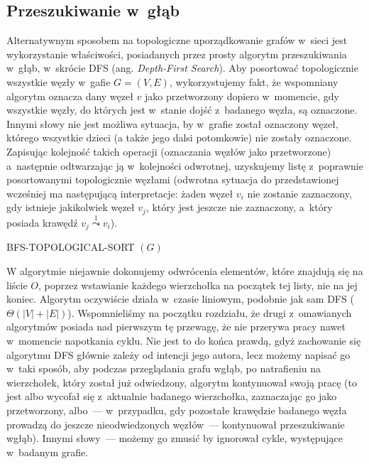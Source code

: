 \subsection{Przeszukiwanie w~głąb}

Alternatywnym sposobem na topologiczne uporządkowanie grafów w~sieci jest wykorzystanie właściwości, posiadanych przez prosty algorytm przeszukiwania w~głąb, w~skrócie \textsf{DFS} (ang. \textit{Depth-First Search}). Aby posortować topologicznie wszystkie węzły w~gafie $G = \left( V, E \right)$, wykorzystujemy fakt, że wspomniany algorytm oznacza dany węzeł $v$ jako przetworzony dopiero w~momencie, gdy wszystkie węzły, do których jest w~stanie dojść z~badanego węzła, są oznaczone. Innymi słowy nie jest możliwa sytuacja, by w~grafie został oznaczony węzeł, którego wszystkie dzieci (a także jego dalsi potomkowie) nie zostały oznaczone. Zapisując kolejność takich operacji (oznaczania węzłów jako przetworzone) a~następnie odtwarzając ją w~kolejności odwrotnej, uzyskujemy listę z~poprawnie posortowanymi topologicznie węzłami (odwrotna sytuacja do przedstawionej wcześniej ma następującą interpretacje: żaden węzeł $v_{i}$ nie zostanie zaznaczony, gdy istnieje jakikolwiek węzeł $v_{j}$, który jest jeszcze nie zaznaczony, a~który posiada krawędź $v_{j} \overset{1} \leadsto v_{i}$).

\begin{algorithm}[!htbp]
\DontPrintSemicolon
{}
\caption{ BFS-TOPOLOGICAL-SORT $\left( G \right)$\label{alg:BFSTopologicalSort}}
\end{algorithm}

W algorytmie niejawnie dokonujemy odwrócenia elementów, które znajdują się na liście $O$, poprzez wstawianie każdego wierzchołka na początek tej listy, nie na jej koniec. Algorytm oczywiście działa w~czasie liniowym, podobnie jak sam \textsf{DFS} ($ \Theta \left( \left| V \right| + \left| E \right| \right)$). Wspomnieliśmy na początku rozdziału, że drugi z~omawianych algorytmów posiada nad pierwszym tę przewagę, że nie przerywa pracy nawet w~momencie napotkania cyklu. Nie jest to do końca prawdą, gdyż zachowanie się algorytmu \textsf{DFS} głównie zależy od intencji jego autora, lecz możemy napisać go w~taki sposób, aby podczas przeglądania grafu wgłąb, po natrafieniu na wierzchołek, który został już odwiedzony, algorytm kontynuował swoją pracę (to jest albo wycofał się z~aktualnie badanego wierzchołka, zaznaczając go jako przetworzony, albo~--- w~przypadku, gdy pozostałe krawędzie badanego węzła prowadzą do jeszcze nieodwiedzonych węzłów~--- kontynuował przeszukiwanie wgłąb). Innymi słowy~--- możemy go zmusić by ignorował cykle, występujące w~badanym grafie.

